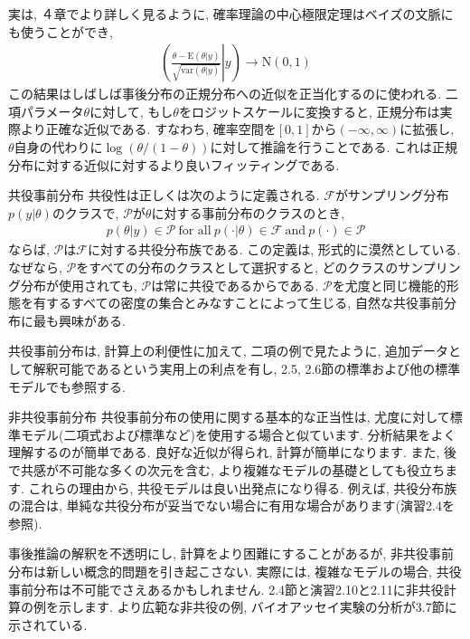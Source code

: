 \documentclass[10pt,dvipdfmx,a4]{beamer}
\newcommand{\eqn}[1]{\begin{align*}#1\end{align*}}
\begin{document}

\begin{frame}
実は, ４章でより詳しく見るように, 確率理論の中心極限定理はベイズの文脈にも使うことができ,
\eqn{ \left( \left. \frac{\theta-\text{E}(\theta|y)}{\sqrt{\text{var}(\theta|y)}} \right| y \right) \rightarrow \text{N}(0,1)}
この結果はしばしば事後分布の正規分布への近似を正当化するのに使われる.
二項パラメータ$\theta$に対して, もし$\theta$をロジットスケールに変換すると, 正規分布は実際より正確な近似である.
すなわち, 確率空間を$[0,1]$から$(-\infty,\infty)$に拡張し, $\theta$自身の代わりに$\log (\theta/(1-\theta))$に対して推論を行うことである.
これは正規分布に対する近似に対するより良いフィッティングである.
\end{frame}


\begin{frame}{共役事前分布}
共役性は正しくは次のように定義される.
$\mathcal{F}$がサンプリング分布$p(y|\theta)$のクラスで, $\mathcal{P}$が$\theta$に対する事前分布のクラスのとき,
\eqn{p(\theta|y)\in\mathcal{P}\ \text{for all}\ p(\cdot|\theta)\in\mathcal{F}\ \text{and}\ p(\cdot)\in \mathcal{P}}
ならば, $\mathcal{P}$は$\mathcal{F}$に対する共役分布族である.
この定義は, 形式的に漠然としている.
なぜなら, $\mathcal{P}$をすべての分布のクラスとして選択すると, どのクラスのサンプリング分布が使用されても, $\mathcal{P}$は常に共役であるからである.
$\mathcal{P}$を尤度と同じ機能的形態を有するすべての密度の集合とみなすことによって生じる, 自然な共役事前分布に最も興味がある.

共役事前分布は, 計算上の利便性に加えて, 二項の例で見たように, 追加データとして解釈可能であるという実用上の利点を有し, 2.5, 2.6節の標準および他の標準モデルでも参照する.
\end{frame}


\begin{frame}{非共役事前分布}
共役事前分布の使用に関する基本的な正当性は, 尤度に対して標準モデル(二項式および標準など)を使用する場合と似ています.
分析結果をよく理解するのが簡単である.
良好な近似が得られ, 計算が簡単になります.
また, 後で共感が不可能な多くの次元を含む, より複雑なモデルの基礎としても役立ちます.
これらの理由から, 共役モデルは良い出発点になり得る.
例えば, 共役分布族の混合は, 単純な共役分布が妥当でない場合に有用な場合があります(演習2.4を参照).

事後推論の解釈を不透明にし, 計算をより困難にすることがあるが, 非共役事前分布は新しい概念的問題を引き起こさない.
実際には, 複雑なモデルの場合, 共役事前分布は不可能でさえあるかもしれません.
2.4節と演習2.10と2.11に非共役計算の例を示します.
より広範な非共役の例, バイオアッセイ実験の分析が3.7節に示されている.
\end{frame}
\end{document}
